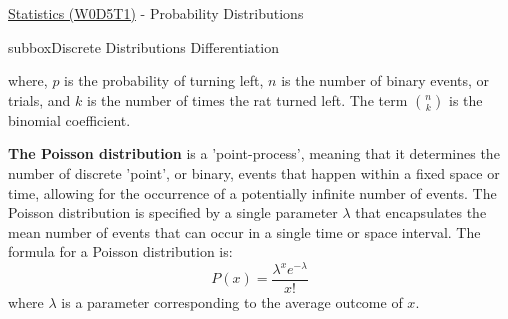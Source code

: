 \begin{textbox}{\href{https://compneuro.neuromatch.io/tutorials/W0D5_Statistics/student/W0D5_Tutorial1.html}{Statistics (W0D5T1)} - Probability Distributions}
\begin{subbox}{subbox}{Discrete Distributions Differentiation}
{where, $p$ is the probability of turning left, $n$ is the number of binary events, or trials, and $k$ is the number of times the rat turned left. The term $\binom {n}{k}$ is the binomial coefficient.

\textbf{The Poisson distribution} is a 'point-process', meaning that it determines the number of discrete 'point', or binary, events that happen within a fixed space or time, allowing for the occurrence of a potentially infinite number of events. The Poisson distribution is specified by a single parameter $\lambda$ that encapsulates the mean number of events that can occur in a single time or space interval.
The formula for a Poisson distribution is: 
\begin{equation}
P(x)=\frac{\lambda^x e^{-\lambda}}{x!}
\end{equation}
where $\lambda$ is a parameter corresponding to the average outcome of $x$.
}
\end{subbox}
\end{textbox}
